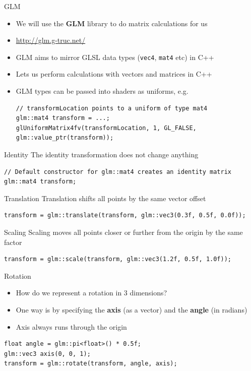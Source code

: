 \begin{frame}[fragile]{GLM}
	\begin{itemize}
		\pause\item We will use the \textbf{GLM} library to do matrix calculations for us
		\pause\item \url{http://glm.g-truc.net/}
		\pause\item GLM aims to mirror GLSL data types (\lstinline{vec4}, \lstinline{mat4} etc) in C++
		\pause\item Lets us perform calculations with vectors and matrices in C++
		\pause\item GLM types can be passed into shaders as uniforms, e.g.
			\begin{lstlisting}
// transformLocation points to a uniform of type mat4
glm::mat4 transform = ...;
glUniformMatrix4fv(transformLocation, 1, GL_FALSE, glm::value_ptr(transform));
			\end{lstlisting}
	\end{itemize}
\end{frame}

\begin{frame}[fragile]{Identity}
	\pause The identity transformation does not change anything
	\pause \begin{lstlisting}
// Default constructor for glm::mat4 creates an identity matrix
glm::mat4 transform;
	\end{lstlisting}
\end{frame}

\begin{frame}[fragile]{Translation}
	\pause Translation shifts all points by the same vector offset
	\pause \begin{lstlisting}
transform = glm::translate(transform, glm::vec3(0.3f, 0.5f, 0.0f));
	\end{lstlisting}
\end{frame}

\begin{frame}[fragile]{Scaling}
	\pause Scaling moves all points closer or further from the origin by the same factor
	\pause \begin{lstlisting}
transform = glm::scale(transform, glm::vec3(1.2f, 0.5f, 1.0f));
	\end{lstlisting}
\end{frame}

\begin{frame}[fragile]{Rotation}
	\begin{itemize}
		\pause\item How do we represent a rotation in 3 dimensions?
		\pause\item One way is by specifying the \textbf{axis} (as a vector) and the \textbf{angle} (in radians)
		\pause\item Axis always runs through the origin
	\end{itemize}
	\pause \begin{lstlisting}
float angle = glm::pi<float>() * 0.5f;
glm::vec3 axis(0, 0, 1);
transform = glm::rotate(transform, angle, axis);
	\end{lstlisting}
\end{frame}

